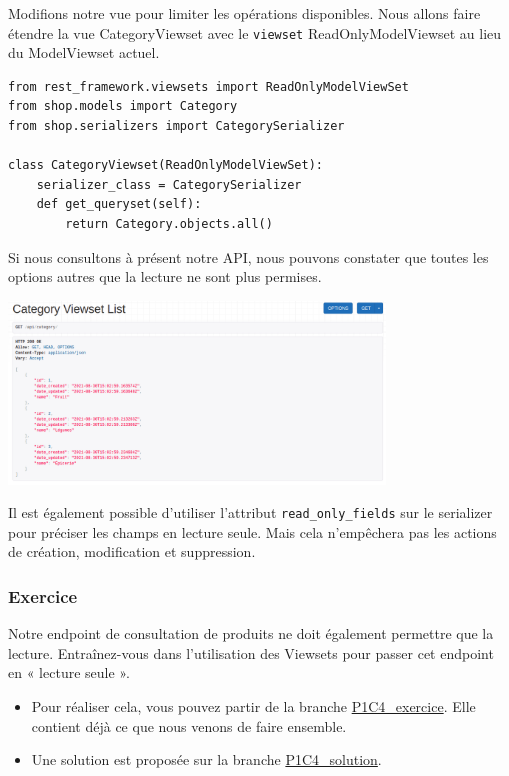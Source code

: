 \documentclass[a4paper]{article}
\begin{document}
Modifions notre vue pour limiter les opérations disponibles. Nous allons faire étendre la vue CategoryViewset  avec le {\tt viewset} {\color{monOrange}ReadOnlyModelViewset}   au lieu du {\color{monOrange}ModelViewset}  actuel.
\begin{verbatim}
from rest_framework.viewsets import ReadOnlyModelViewSet
from shop.models import Category
from shop.serializers import CategorySerializer
 
class CategoryViewset(ReadOnlyModelViewSet):
    serializer_class = CategorySerializer
    def get_queryset(self):
        return Category.objects.all()
\end{verbatim}
Si nous consultons à présent notre API, nous pouvons constater que toutes les options autres que la lecture ne sont plus permises.
\begin{center}
\includegraphics[width=10cm]{images/image08.png}
\end{center}
\begin{theorem}
Il est également possible d’utiliser l’attribut   {\tt read\_only\_fields}  sur le serializer pour préciser les champs en lecture seule. Mais cela n'empêchera pas les actions de création, modification et suppression.
\end{theorem}
\subsubsection*{Exercice}
Notre endpoint de consultation de produits ne doit également permettre que la lecture. Entraînez-vous dans l’utilisation des Viewsets  pour passer cet endpoint en « lecture seule ».
\begin{itemize}
\item Pour réaliser cela, vous pouvez partir de la branche \href{https://github.com/OpenClassrooms-Student-Center/7192416\_APIs\_DRF/tree/P1C4\_exercice}{P1C4\_exercice}. Elle contient déjà ce que nous venons de faire ensemble.
\item Une solution est proposée sur la branche \href{https://github.com/OpenClassrooms-Student-Center/7192416\_APIs\_DRF/tree/P1C4_solution}{P1C4\_solution}.
\end{itemize}
\end{document}
